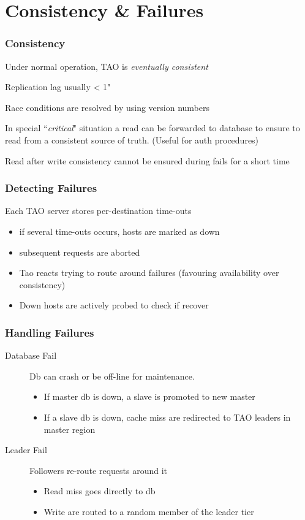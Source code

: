 \section{Consistency \& Failures}
\begin{frame}[t]\frametitle{Consistency}
	Under normal operation, TAO is \emph{eventually consistent}

	Replication lag usually < 1"

	Race conditions are resolved by using version numbers

	In special ``\emph{critical}" situation a read can be forwarded to database to ensure to read from a consistent source of truth. (Useful for auth procedures)


	Read after write consistency cannot be ensured during fails for a short time
\end{frame}

\begin{frame}[t]\frametitle{Detecting Failures}
    Each TAO server stores per-destination time-outs
    \begin{itemize}
    	\item if several time-outs occurs, hosts are marked as down
    	\item subsequent requests are aborted
    	\item Tao reacts trying to route around failures (favouring availability over consistency)
    	\item Down hosts are actively probed to check if recover
    \end{itemize}
\end{frame}

\begin{frame}[c]\frametitle{Handling Failures}
    \begin{description}
    	\item[Database Fail] Db can crash or be off-line for maintenance. 
    	\begin{itemize}
    		\item If master db is down, a slave is promoted to new master
    		\item If a slave db is down, cache miss are redirected to TAO leaders in master region
    	\end{itemize}
    	\item[Leader Fail] Followers re-route requests around it
    	\begin{itemize}
    		\item Read miss goes directly to db
    		\item Write are routed to a random member of the leader tier
    	\end{itemize}
    \end{description}
\end{frame}

